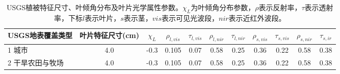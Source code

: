 \begin{sidewaystable}[]
\centering
\caption{USGS植被特征尺寸、叶倾角分布及叶片光学属性参数。$\chi_L$为叶倾角分布参数，$\rho$表示反射率，$\tau$表示透射率，下标$l$表示叶片，$s$表示茎，$vis$表示可见光波段，$nir$表示近红外波段。}
\label{tab:USGS植被特征尺寸叶倾角分布及叶片光学属性参数1}
    \begin{tabular}{@{}lcccccccccc@{}}
    \toprule
    USGS地表覆盖类型     & 叶片特征尺寸(cm) & $\chi_L$ &$\rho_{l, vis}$ & $\tau_{l, v i s}$  &$\rho_{l,  nir}$ &$\tau_{l,  nir}$ & $\rho_{s, v i s}$ &$\tau_{s, v i s}$ &$\rho_{s,  nir}$ &$\tau_{s,ir}$\\ \midrule
    1 城市           & 4.0        & -0.3                                                                         & 0.105                                                                                                           & 0.07                                                                                                            & 0.58                                                                                                            & 0.25                                                                                                            & 0.36                                                                                                            & 0.22                                                                                                            & 0.58                                                                                                            & 0.38                                                                                                            \\
    2 干旱农田与牧场      & 4.0        & -0.3                                                                         & 0.105                                                                                                           & 0.07                                                                                                            & 0.58                                                                                                            & 0.25                                                                                                            & 0.36                                                                                                            & 0.22                                                                                                            & 0.58                                                                                                            & 0.38                                                                                                            \\

\end{tabular}
\end{sidewaystable}
